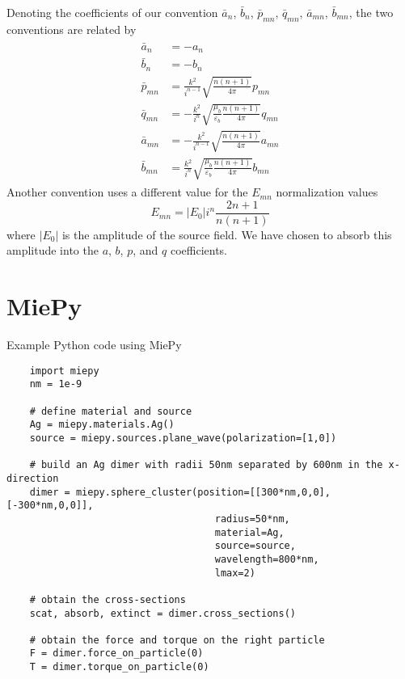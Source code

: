 \documentclass[11pt]{article}
\begin{document}
Denoting the coefficients of our convention $\bar a_n$, $\bar b_n$, $\bar p_{mn}$, $\bar q_{mn}$, $\bar a_{mn}$, $\bar b_{mn}$, the two conventions are related by
\begin{align}
\begin{split}
    \bar a_{n} &= - a_{n} \\
    \bar b_{n} &= - b_{n} \\
    \bar p_{mn} &= \frac{k^2}{i^{n-1}}\sqrt{\frac{n(n+1)}{4\pi}} p_{mn} \\
    \bar q_{mn} &= -\frac{k^2}{i^n}\sqrt{\frac{\mu_b}{\varepsilon_b} \frac{n(n+1)}{4\pi}} q_{mn} \\
    \bar a_{mn} &= -\frac{k^2}{i^{n-1}}\sqrt{\frac{n(n+1)}{4\pi}} a_{mn} \\
    \bar b_{mn} &= \frac{k^2}{i^n}\sqrt{\frac{\mu_b}{\varepsilon_b} \frac{n(n+1)}{4\pi}} b_{mn}
\end{split}
\end{align}
Another convention uses a different value for the $E_{mn}$ normalization values \cite{xu1995electromagnetic}
\begin{equation}
    E_{mn} = |E_0|i^n \frac{2n+1}{n(n+1)}
\end{equation}
where $|E_0|$ is the amplitude of the source field.
We have chosen to absorb this amplitude into the $a$, $b$, $p$, and $q$ coefficients.

\section{MiePy}

Example Python code using MiePy
\begin{lstlisting}
    import miepy
    nm = 1e-9

    # define material and source
    Ag = miepy.materials.Ag()
    source = miepy.sources.plane_wave(polarization=[1,0])

    # build an Ag dimer with radii 50nm separated by 600nm in the x-direction
    dimer = miepy.sphere_cluster(position=[[300*nm,0,0], [-300*nm,0,0]],
                                    radius=50*nm,
                                    material=Ag,
                                    source=source,
                                    wavelength=800*nm,
                                    lmax=2)

    # obtain the cross-sections
    scat, absorb, extinct = dimer.cross_sections()

    # obtain the force and torque on the right particle
    F = dimer.force_on_particle(0)
    T = dimer.torque_on_particle(0)
\end{lstlisting}
\end{document}
